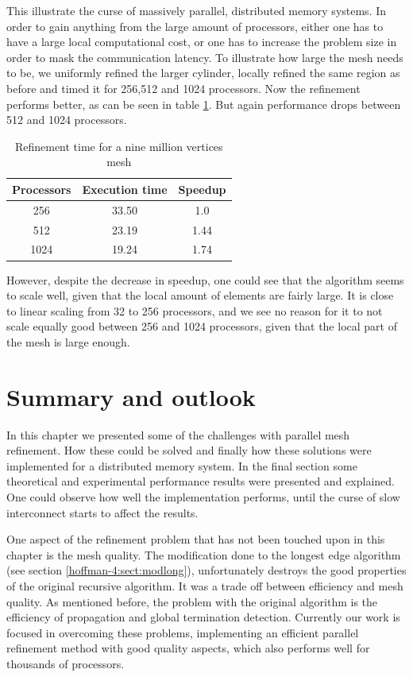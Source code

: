 This illustrate the curse of massively parallel, distributed memory
systems. In order to gain anything from the large amount of
processors, either one has to have a large local computational cost,
or one has to increase the problem size in order to mask the communication
latency. To illustrate how large the mesh needs to be, we uniformly
refined the larger cylinder, locally refined the same region as before
and timed it for 256,512 and 1024 processors. Now the refinement
performs better, as can be seen in table \ref{hoffman-4:tab:reftime}. But
again performance drops between 512 and 1024 processors.
\begin{table}[t]
  \begin{center}
    \begin{tabular}{|c|c|c|}
      \hline
      Processors & Execution time & Speedup \\
      \hline
      256 & 33.50 & 1.0 \\
      512 & 23.19 & 1.44 \\
      1024 & 19.24 & 1.74 \\
      \hline
    \end{tabular}
  \end{center}
  \caption{\label{hoffman-4:tab:reftime} Refinement time for a nine million vertices mesh}
\end{table}

However, despite the decrease in speedup, one could see that the
algorithm seems to scale well, given that the local amount of elements
are fairly large. It is close to linear scaling from 32 to 256
processors, and we see no reason for it to not scale equally good
between 256 and 1024 processors, given that the local part of the mesh
is large enough.

\section{Summary and outlook}

In this chapter we presented some of the challenges with parallel mesh
refinement. How these could be solved and finally how these solutions
were implemented for a distributed memory system. In the final section
some theoretical and experimental performance results were presented
and explained. One could observe how well the implementation performs,
until the curse of slow interconnect starts to affect the results.

One aspect of the refinement problem that has not been touched upon in
this chapter is the mesh quality. The modification done to the longest
edge algorithm (see section \ref{hoffman-4:sect:modlong}), unfortunately
destroys the good properties of the original recursive algorithm. It
was a trade off between efficiency and mesh quality. As mentioned
before, the problem with the original algorithm is the efficiency of
propagation and global termination detection. Currently our work is
focused in overcoming these problems, implementing an efficient
parallel refinement method with good quality aspects, which also
performs well for thousands of processors.

